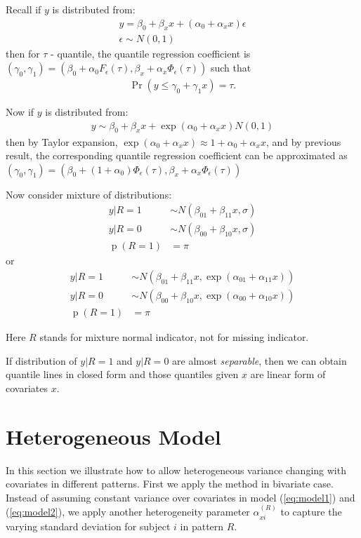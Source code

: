 \documentclass[12pt]{article}
\DeclareMathOperator{\pr}{p}
\DeclareMathOperator{\prob}{Pr}
\begin{document}
Recall if $y$ is distributed from:
\begin{align*}
y =  \beta_0 + \beta_x x + (\alpha_0 + \alpha_xx) \epsilon \\
\epsilon \sim N(0, 1)
\end{align*}
then for $\tau$ - quantile, the quantile regression coefficient is $(\gamma_0, \gamma_1) 
= (\beta_0 + \alpha_0F_{\epsilon}(\tau), \beta_x + \alpha_x\Phi_{\epsilon}(\tau))$ such that
\begin{align*}
\prob (y \leq \gamma_0 + \gamma_1x) = \tau.
\end{align*}

Now if $y$ is distributed from:
\begin{align*}
y \sim \beta_0 + \beta_x x + \exp(\alpha_0 + \alpha_xx) N(0, 1)
\end{align*}
then by Taylor expansion, $\exp(\alpha_0 + \alpha_xx) \approx 1 + \alpha_0 + \alpha_xx$, and by previous result, the
corresponding quantile regression coefficient can be approximated as 
$(\gamma_0, \gamma_1) 
= (\beta_0 + (1 + \alpha_0)\Phi_{\epsilon}(\tau), \beta_x + \alpha_x\Phi_{\epsilon}(\tau))$ 

Now consider mixture of distributions:
\begin{align*}
  y | R = 1 & \sim N(\beta_{01} + \beta_{11}x,  \sigma)\\
  y | R = 0 & \sim N(\beta_{00} + \beta_{10}x, \sigma) \\
  \pr (R = 1) & = \pi
\end{align*}
or
\begin{align*}
  y | R = 1 & \sim N(\beta_{01} + \beta_{11}x,  \exp(\alpha_{01} + \alpha_{11}x))\\
  y | R = 0 & \sim N(\beta_{00} + \beta_{10}x, \exp(\alpha_{00}+ \alpha_{10}x)) \\
  \pr (R = 1) & = \pi
\end{align*}

Here $R$ stands for mixture normal indicator, not for missing
indicator.

If distribution of $y|R = 1$ and $y | R = 0$ are almost \textit{separable}, then we can obtain quantile lines in closed form and those quantiles given $x$ are linear form of covariates $x$.


\section{Heterogeneous Model}
\label{sec:heter}

In this section we illustrate how to allow heterogeneous variance
changing with covariates in different patterns.  First we apply the
method in bivariate case. Instead of assuming constant variance over
covariates in model (\ref{eq:model1}) and (\ref{eq:model2}), we apply
another heterogeneity parameter $\alpha_{xi}^{(R)}$ to capture the
varying standard deviation for subject $i$ in pattern $R$.
\end{document}
